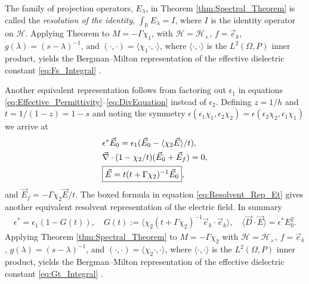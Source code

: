 \documentclass[english,12pt]{ttuthes}
\begin{document}
% 
The family of projection operators, $E_{\lambda}$, in Theorem
\ref{thm:Spectral_Theorem} is called the \emph{resolution of the
  identity}, $\int_{\mathbb{R}}E_{\lambda}=I$, where $I$ is the identity
operator on $\mathscr{H}$. Applying Theorem to $M=-\Gamma\chi_1$, with
$\mathscr{H}=\mathscr{H}_\times$, $f=\vec{e}_k$, $g(\lambda)=(s-\lambda)^{-1}$, and
$(\cdot,\cdot)=\langle\chi_1\cdot,\cdot\rangle$, where $\langle\cdot,\cdot\rangle$ is the $L^2(\Omega,P)$ inner product,
yields the Bergman--Milton representation of the effective dielectric
constant \eqref{eq:Fs_Integral}
\cite{Bergman:PRL-1285,Milton:APL-300,Golden:CMP-473}.

Another equivalent representation follows from factoring out $\epsilon_1$ in
equations \eqref{eq:Effective_Permittivity}--\eqref{eq:DivEquation}
instead of $\epsilon_2$. Defining $z = 1/h$ and $t=1/(1-z)=1-s$ and noting
the symmetry $\epsilon(\epsilon_1\chi_1,\epsilon_2\chi_2)=\epsilon(\epsilon_2\chi_2,\epsilon_1\chi_1)$ we arrive at  
%
\begin{align}\label{eq:Resolvent_Rep_Et}
   &\epsilon^*\vec{E}_0=\epsilon_1(\vec{E}_0-\langle\chi_2\vec{E}\rangle/t),\notag\\
    &\vec{\nabla}\cdot(1-\chi_2/t)(\vec{E}_0+\vec{E}_f)=0,\notag\\
    &\boxed{\vec{E}=t(t+\Gamma\chi_2)^{-1}\vec{E}_0},
\end{align}
%
and $\vec{E}_f=-\Gamma\chi_2\vec{E}/t$. The boxed formula in equation
\eqref{eq:Resolvent_Rep_Et} gives another equivalent resolvent
representation of the electric field. In summary
%
\begin{align}\label{eq:Herglotz_Energy_Rep_G}
  \epsilon^*=\epsilon_1(1-G(t)),\quad
  G(t):=\langle\chi_2(t+\Gamma\chi_2)^{-1}\vec{e}_k\cdot\vec{e}_k\rangle, \quad
  \langle\vec{D}\cdot\vec{E}\rangle=\epsilon^*E_0^2.
\end{align}
%
Applying Theorem \ref{thm:Spectral_Theorem} to $M=-\Gamma\chi_2$
with $\mathscr{H}=\mathscr{H}_\times$, $f=\vec{e}_k$,
$g(\lambda)=(s-\lambda)^{-1}$, and  
$(\cdot,\cdot)=\langle\chi_2\cdot,\cdot\rangle$, where $\langle\cdot,\cdot\rangle$ is the $L^2(\Omega,P)$
inner product, yields the Bergman--Milton representation of the
effective dielectric constant \eqref{eq:Gt_Integral}
\cite{Bergman:AP-78}. 
\end{document}
